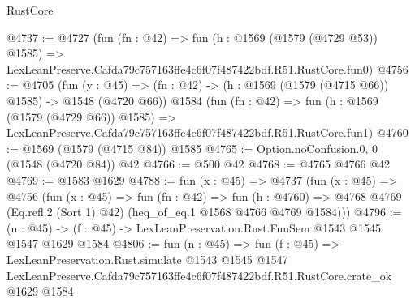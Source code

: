 \begin{lexlean}{RustCore}
\begin{coremodule}
@4737 := @4727
    (fun (fn : @42) =>
    fun (h : @1569 (@1579 (@4729 @53)) @1585) =>
    LexLeanPreserve.Cafda79c757163ffe4c6f07f487422bdf.R51.RustCore.fun0)
@4756 := @4705
    (fun (y : @45) => (fn : @42) -> (h : @1569 (@1579 (@4715 @66)) @1585) -> @1548 (@4720 @66))
    @1584
    (fun (fn : @42) =>
    fun (h : @1569 (@1579 (@4729 @66)) @1585) =>
    LexLeanPreserve.Cafda79c757163ffe4c6f07f487422bdf.R51.RustCore.fun1)
@4760 := @1569 (@1579 (@4715 @84)) @1585
@4765 := Option.noConfusion.{0, 0} (@1548 (@4720 @84)) @42
@4766 := @500 @42
@4768 := @4765 @4766 @42
@4769 := @1583 @1629
@4788 := fun (x : @45) =>
  @4737
    (fun (x : @45) =>
    @4756
      (fun (x : @45) =>
      fun (fn : @42) =>
      fun (h : @4760) =>
      @4768 @4769 (Eq.refl.{2} (Sort 1) @42) (heq_of_eq.{1} @1568 @4766 @4769 @1584)))
@4796 := (n : @45) -> (f : @45) -> LexLeanPreservation.Rust.FunSem @1543 @1545 @1547 @1629 @1584
@4806 := fun (n : @45) =>
  fun (f : @45) =>
  LexLeanPreservation.Rust.simulate
    @1543
    @1545
    @1547
    LexLeanPreserve.Cafda79c757163ffe4c6f07f487422bdf.R51.RustCore.crate_ok
    @1629
    @1584
\end{coremodule}
\end{lexlean}
